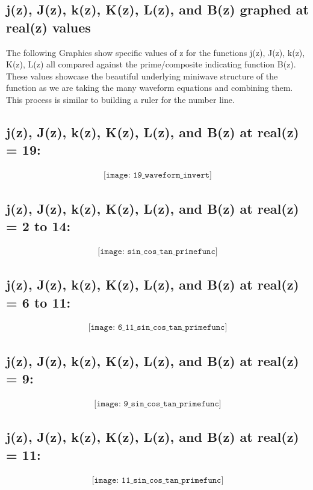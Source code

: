 \documentclass{article}
\begin{document}
\subsection*{j(z), J(z), k(z), K(z), L(z), and B(z) graphed at real(z) values}
The following Graphics show specific values of z for the functions j(z), J(z), k(z), K(z), L(z) all compared against the prime/composite indicating function B(z). These values showcase the beautiful underlying miniwave structure of the function as we are taking the many waveform equations and combining them. This process is similar to building a ruler for the number line. \\

\subsection*{j(z), J(z), k(z), K(z), L(z), and B(z) at real(z) = 19:}
\begin{align*}
\texttt{[image: 19\_waveform\_invert]}
\end{align*}

\subsection*{j(z), J(z), k(z), K(z), L(z), and B(z) at real(z) = 2 to 14:}
\begin{align*}
\texttt{[image: sin\_cos\_tan\_primefunc]}
\end{align*}

\subsection*{j(z), J(z), k(z), K(z), L(z), and B(z) at real(z) = 6 to 11:}
\begin{align*}
\texttt{[image: 6\_11\_sin\_cos\_tan\_primefunc]}
\end{align*}

\subsection*{j(z), J(z), k(z), K(z), L(z), and B(z) at real(z) = 9:}
\begin{align*}
\texttt{[image: 9\_sin\_cos\_tan\_primefunc]}
\end{align*}

\subsection*{j(z), J(z), k(z), K(z), L(z), and B(z) at real(z) = 11:}
\begin{align*}
\texttt{[image: 11\_sin\_cos\_tan\_primefunc]}
\end{align*}
\end{document}
